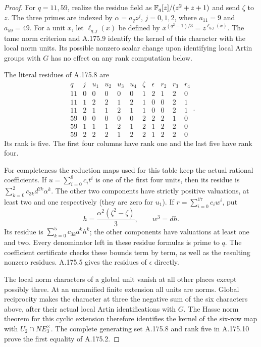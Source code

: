 \begin{proof}
For $q=11,59$, realize the residue field as
$\mathbb F_q[z]/(z^2+z+1)$ and send $\zeta$ to $z$.
The three primes are indexed by
$\alpha=a_qz^j$, $j=0,1,2$, where $a_{11}=9$ and $a_{59}=49$.
For a unit $x$, let $\ell_{q,j}(x)$ be defined by
$\bar x^{(q^2-1)/3}=z^{\ell_{q,j}(x)}$.
The tame norm criterion and A.175.9 identify the kernel of this
character with the local norm units.  Its possible nonzero scalar
change upon identifying local Artin groups with $G$ has no effect
on any rank computation below.

The literal residues of A.175.8 are
\[
 \begin{array}{rr|rrrrrrrrr}
 q&j&u_1&u_2&u_3&u_4&\zeta&\epsilon&r_2&r_3&r_4\\ \hline
 11&0&0&0&0&0&1&2&1&2&0\\
 11&1&2&2&1&2&1&0&0&2&1\\
 11&2&1&1&2&1&1&0&0&2&1\\
 59&0&0&0&0&0&2&2&2&1&0\\
 59&1&1&1&2&1&2&1&2&2&0\\
 59&2&2&2&1&2&2&1&2&2&0
 \end{array}.
\tag{A.175.10}
\]
Its rank is five.  The first four columns have rank one and the
last five have rank four.

For completeness the reduction maps used for this table keep the
actual rational coefficients.  If $u=\sum_{i=0}^8c_it^i$ is one of
the first four units, then its residue is
$\sum_{k=0}^2c_{3k}d^{2k}\alpha^k$.  The other two components have
strictly positive valuations, at least two and one respectively
(they are zero for $u_1$).  If $r=\sum_{i=0}^{17}c_iw^i$, put
\[
 h=\frac{\alpha^2(\zeta^2-\zeta)}3,\qquad w^3=dh.
\tag{A.175.11}
\]
Its residue is $\sum_{k=0}^5c_{3k}d^kh^k$; the other components
have valuations at least one and two.  Every denominator left in
these residue formulas is prime to $q$.  The coefficient certificate
checks these bounds term by term, as well as the resulting nonzero
residues.  A.175.5 gives the residues of $\epsilon$ directly.

The local norm characters of a global unit vanish at all other
places except possibly three.  At an unramified finite extension
all units are norms.  Global reciprocity makes the character at
three the negative sum of the six characters above, after their
actual local Artin identifications with $G$.
The Hasse norm theorem for this cyclic extension
\cite[Chapter VIII, Theorem 3.1, printed p.~234]{MilneCFT}
therefore identifies
the kernel of the six-row map with $U_2\cap N E_3^\times$.
The complete generating set A.175.8 and rank five in A.175.10 prove
the first equality of A.175.2.


\end{proof}
